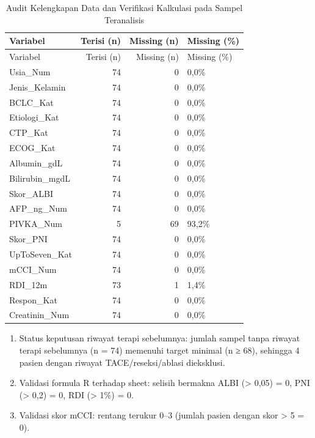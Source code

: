 \documentclass[
  indonesian,
]{report}
\providecommand{\tightlist}{%
  \setlength{\itemsep}{0pt}\setlength{\parskip}{0pt}}
\begin{document}
\begin{longtable}[]{@{}lrrl@{}}
\caption{Audit Kelengkapan Data dan Verifikasi Kalkulasi pada Sampel
Teranalisis}\tabularnewline
\toprule\noalign{}
Variabel & Terisi (n) & Missing (n) & Missing (\%) \\
\midrule\noalign{}
\endfirsthead
\toprule\noalign{}
Variabel & Terisi (n) & Missing (n) & Missing (\%) \\
\midrule\noalign{}
\endhead
\bottomrule\noalign{}
\endlastfoot
Usia\_Num & 74 & 0 & 0,0\% \\
Jenis\_Kelamin & 74 & 0 & 0,0\% \\
BCLC\_Kat & 74 & 0 & 0,0\% \\
Etiologi\_Kat & 74 & 0 & 0,0\% \\
CTP\_Kat & 74 & 0 & 0,0\% \\
ECOG\_Kat & 74 & 0 & 0,0\% \\
Albumin\_gdL & 74 & 0 & 0,0\% \\
Bilirubin\_mgdL & 74 & 0 & 0,0\% \\
Skor\_ALBI & 74 & 0 & 0,0\% \\
AFP\_ng\_Num & 74 & 0 & 0,0\% \\
PIVKA\_Num & 5 & 69 & 93,2\% \\
Skor\_PNI & 74 & 0 & 0,0\% \\
UpToSeven\_Kat & 74 & 0 & 0,0\% \\
mCCI\_Num & 74 & 0 & 0,0\% \\
RDI\_12m & 73 & 1 & 1,4\% \\
Respon\_Kat & 74 & 0 & 0,0\% \\
Creatinin\_Num & 74 & 0 & 0,0\% \\
\end{longtable}

\begin{enumerate}
\def\labelenumi{\arabic{enumi}.}
\tightlist
\item
  Status keputusan riwayat terapi sebelumnya: jumlah sampel tanpa
  riwayat terapi sebelumnya (n = 74) memenuhi target minimal (n ≥ 68),
  sehingga 4 pasien dengan riwayat TACE/reseksi/ablasi dieksklusi.
\item
  Validasi formula R terhadap sheet: selisih bermakna ALBI
  (\textgreater{} 0,05) = 0, PNI (\textgreater{} 0,2) = 0, RDI
  (\textgreater{} 1\%) = 0.
\item
  Validasi skor mCCI: rentang terukur 0--3 (jumlah pasien dengan skor
  \textgreater{} 5 = 0).
\end{enumerate}
\end{document}
